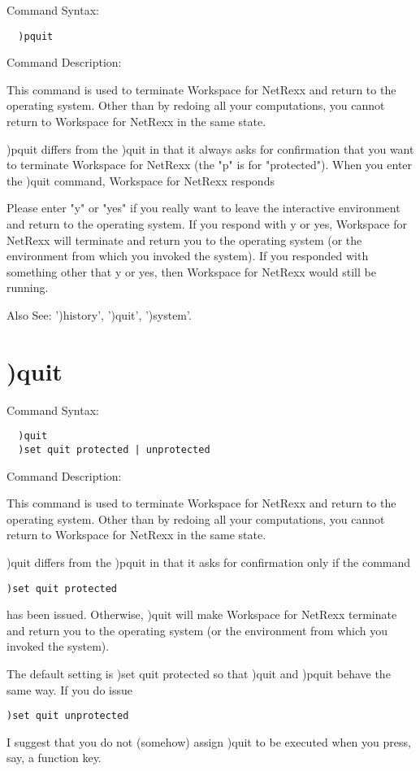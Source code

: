 Command Syntax:
\begin{verbatim}
  )pquit
\end{verbatim}
Command Description:

This command is used to terminate Workspace for NetRexx and return to the operating system. Other than by redoing all your computations, you cannot return to Workspace for NetRexx in the same state.

)pquit differs from the )quit in that it always asks for confirmation that you want to terminate Workspace for NetRexx (the "p" is for "protected"). When you enter the )quit command, Workspace for NetRexx responds

  Please enter "y" or "yes" if you really want to leave the interactive
  environment and return to the operating system.
If you respond with y or yes, Workspace for NetRexx will terminate and return you to the operating system (or the environment from which you invoked the system). If you responded with something other that y or yes, then Workspace for NetRexx would still be running.

Also See: ')history', ')quit', ')system'.

\section{)quit}

Command Syntax:
\begin{verbatim}
  )quit
  )set quit protected | unprotected
\end{verbatim}
Command Description:

This command is used to terminate Workspace for NetRexx and return to the operating system. Other than by redoing all your computations, you cannot return to Workspace for NetRexx in the same state.

)quit differs from the )pquit in that it asks for confirmation only if the command
\begin{verbatim}
)set quit protected
\end{verbatim}
has been issued. Otherwise, )quit will make Workspace for NetRexx terminate and return you to the operating system (or the environment from which you invoked the system).

The default setting is )set quit protected so that )quit and )pquit behave the same way. If you do issue
\begin{verbatim}
)set quit unprotected
\end{verbatim}
I suggest that you do not (somehow) assign )quit to be executed when you press, say, a function key.

